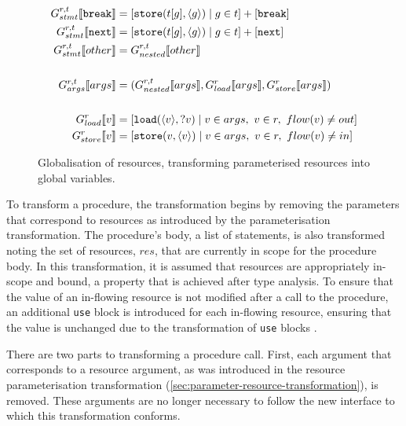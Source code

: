 \begin{figure}[htb]
\begin{adjustwidth}{-2.5em}{-2.5em}
\begin{align*}
      G_{stmt}^{r, t}\bbrackets*{\mathtt{break}} &= [\mathtt{store}(t[g], \angles{g}) \mid g \in t] + [\mathtt{break}] \\
      G_{stmt}^{r, t}\bbrackets*{\mathtt{next}} &= [\mathtt{store}(t[g], \angles{g}) \mid g \in t] + [\mathtt{next}] \\
      G_{stmt}^{r, t}\bbrackets*{other} &= G_{nested}^{r, t}\bbrackets*{other} \\\\
      G_{args}^{r, t}\bbrackets*{args} &= (G_{nested}^{r, t}\bbrackets*{args}, G_{load}^r\bbrackets*{args}, G_{store}^r\bbrackets*{args})\\\\
      G_{load}^r\bbrackets*{v} &= [\mathtt{load}(\angles{v}, ?v) \mid v \in args,\ v \in r,\ flow(v) \neq out] \\
      G_{store}^r\bbrackets*{v} &= [\mathtt{store}(v, \angles{v}) \mid v \in args,\ v \in r,\ flow(v) \neq in]
    \end{align*}
  \end{adjustwidth}
  \caption{Globalisation of resources, transforming parameterised resources into global variables.}
  \label{fig:global-transformation}
\end{figure}

To transform a procedure, the transformation begins by removing the parameters that correspond to resources as introduced by the parameterisation transformation. The procedure's body, a list of statements, is also transformed noting the set of resources, $res$, that are currently in scope for the procedure body. In this transformation, it is assumed that resources are appropriately in-scope and bound, a property that is achieved after type analysis. To ensure that the value of an in-flowing resource is not modified after a call to the procedure, an additional \texttt{use} block is introduced for each in-flowing resource, ensuring that the value is unchanged due to the transformation of \texttt{use} blocks .

There are two parts to transforming a procedure call. First, each argument that corresponds to a resource argument, as was introduced in the resource parameterisation transformation (\cref{sec:parameter-resource-transformation}), is removed. These arguments are no longer necessary to follow the new interface to which this transformation conforms. 

